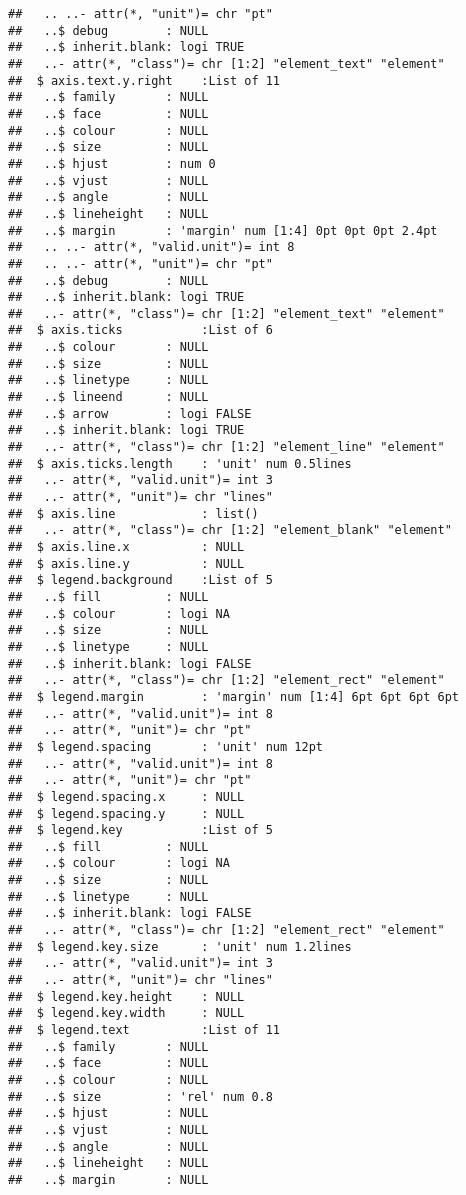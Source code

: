 \documentclass[]{article}
\begin{document}
\begin{verbatim}
##   .. ..- attr(*, "unit")= chr "pt"
##   ..$ debug        : NULL
##   ..$ inherit.blank: logi TRUE
##   ..- attr(*, "class")= chr [1:2] "element_text" "element"
##  $ axis.text.y.right    :List of 11
##   ..$ family       : NULL
##   ..$ face         : NULL
##   ..$ colour       : NULL
##   ..$ size         : NULL
##   ..$ hjust        : num 0
##   ..$ vjust        : NULL
##   ..$ angle        : NULL
##   ..$ lineheight   : NULL
##   ..$ margin       : 'margin' num [1:4] 0pt 0pt 0pt 2.4pt
##   .. ..- attr(*, "valid.unit")= int 8
##   .. ..- attr(*, "unit")= chr "pt"
##   ..$ debug        : NULL
##   ..$ inherit.blank: logi TRUE
##   ..- attr(*, "class")= chr [1:2] "element_text" "element"
##  $ axis.ticks           :List of 6
##   ..$ colour       : NULL
##   ..$ size         : NULL
##   ..$ linetype     : NULL
##   ..$ lineend      : NULL
##   ..$ arrow        : logi FALSE
##   ..$ inherit.blank: logi TRUE
##   ..- attr(*, "class")= chr [1:2] "element_line" "element"
##  $ axis.ticks.length    : 'unit' num 0.5lines
##   ..- attr(*, "valid.unit")= int 3
##   ..- attr(*, "unit")= chr "lines"
##  $ axis.line            : list()
##   ..- attr(*, "class")= chr [1:2] "element_blank" "element"
##  $ axis.line.x          : NULL
##  $ axis.line.y          : NULL
##  $ legend.background    :List of 5
##   ..$ fill         : NULL
##   ..$ colour       : logi NA
##   ..$ size         : NULL
##   ..$ linetype     : NULL
##   ..$ inherit.blank: logi FALSE
##   ..- attr(*, "class")= chr [1:2] "element_rect" "element"
##  $ legend.margin        : 'margin' num [1:4] 6pt 6pt 6pt 6pt
##   ..- attr(*, "valid.unit")= int 8
##   ..- attr(*, "unit")= chr "pt"
##  $ legend.spacing       : 'unit' num 12pt
##   ..- attr(*, "valid.unit")= int 8
##   ..- attr(*, "unit")= chr "pt"
##  $ legend.spacing.x     : NULL
##  $ legend.spacing.y     : NULL
##  $ legend.key           :List of 5
##   ..$ fill         : NULL
##   ..$ colour       : logi NA
##   ..$ size         : NULL
##   ..$ linetype     : NULL
##   ..$ inherit.blank: logi FALSE
##   ..- attr(*, "class")= chr [1:2] "element_rect" "element"
##  $ legend.key.size      : 'unit' num 1.2lines
##   ..- attr(*, "valid.unit")= int 3
##   ..- attr(*, "unit")= chr "lines"
##  $ legend.key.height    : NULL
##  $ legend.key.width     : NULL
##  $ legend.text          :List of 11
##   ..$ family       : NULL
##   ..$ face         : NULL
##   ..$ colour       : NULL
##   ..$ size         : 'rel' num 0.8
##   ..$ hjust        : NULL
##   ..$ vjust        : NULL
##   ..$ angle        : NULL
##   ..$ lineheight   : NULL
##   ..$ margin       : NULL

\end{verbatim}
\end{document}
